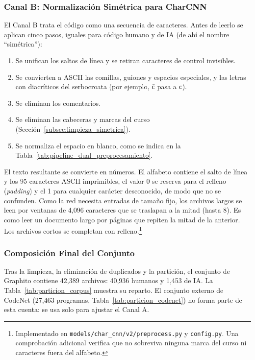 \subsubsection{Canal B: Normalización Simétrica para CharCNN}
\label{subsec:prep_estilometria}

El Canal B trata el código como una secuencia de caracteres. Antes de leerlo se aplican cinco pasos, iguales para código humano y de IA (de ahí el nombre ``simétrica''):

\begin{enumerate}
    \item Se unifican los saltos de línea y se retiran caracteres de control invisibles.
    \item Se convierten a ASCII las comillas, guiones y espacios especiales, y las letras con diacríticos del serbocroata (por ejemplo, \texttt{č} pasa a \texttt{c}).
    \item Se eliminan los comentarios.
    \item Se eliminan las cabeceras y marcas del curso (Sección~\ref{subsec:limpieza_simetrica}).
    \item Se normaliza el espacio en blanco, como se indica en la Tabla~\ref{tab:pipeline_dual_preprocesamiento}.
\end{enumerate}

El texto resultante se convierte en números. El alfabeto contiene el salto de línea y los 95 caracteres ASCII imprimibles, el valor 0 se reserva para el relleno (\textit{padding}) y el 1 para cualquier carácter desconocido, de modo que no se confunden. Como la red necesita entradas de tamaño fijo, los archivos largos se leen por ventanas de 4,096 caracteres que se traslapan a la mitad (hasta 8). Es como leer un documento largo por páginas que repiten la mitad de la anterior. Los archivos cortos se completan con relleno.\footnote{Implementado en \texttt{models/char\_cnn/v2/preprocess.py} y \texttt{config.py}. Una comprobación adicional verifica que no sobreviva ninguna marca del curso ni caracteres fuera del alfabeto.}

\subsubsection{Composición Final del Conjunto}
\label{subsec:composicion_final}

Tras la limpieza, la eliminación de duplicados y la partición, el conjunto de Graphito contiene 42,389 archivos: 40,936 humanos y 1,453 de IA. La Tabla~\ref{tab:particion_corpus} muestra su reparto. El conjunto externo de CodeNet (27,463 programas, Tabla~\ref{tab:particion_codenet}) no forma parte de esta cuenta: se usa solo para ajustar el Canal A.

